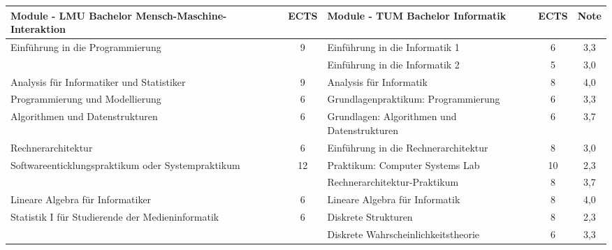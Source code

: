 \documentclass[11pt, a4paper]{awesome-cv}
\begin{document}
\begin{table*}
  \scriptsize
  \centering
  \begin{tabularx}{\textwidth}{|X|c|X|c|c|}

    \hline
    Module - LMU Bachelor Mensch-Maschine-Interaktion      & ECTS & Module - TUM Bachelor Informatik               & ECTS & Note \\
    \hline
    Einführung in die Programmierung                       & 9    & Einführung in die Informatik 1                 & 6    & 3,3  \\
                                                           &      & Einführung in die Informatik 2                 & 5    & 3,0  \\

    \rowcolor{awesome!25}
    Analysis für Informatiker und Statistiker              & 9    & Analysis für Informatik                        & 8    & 4,0  \\

    Programmierung und Modellierung                        & 6    & Grundlagenpraktikum: Programmierung            & 6    & 3,3  \\

    \rowcolor{awesome!25}
    Algorithmen und Datenstrukturen                        & 6    & Grundlagen: Algorithmen und Datenstrukturen    & 6    & 3,7  \\

    Rechnerarchitektur                                     & 6    & Einführung in die Rechnerarchitektur           & 8    & 3,0  \\

    \rowcolor{awesome!25}
    Softwareenticklungspraktikum oder Systempraktikum      & 12   & Praktikum: Computer Systems Lab                & 10   & 2,3  \\
    \rowcolor{awesome!25}
                                                           &      & Rechnerarchitektur-Praktikum                   & 8    & 3,7  \\

    Lineare Algebra für Informatiker                       & 6    & Lineare Algebra für Informatik                 & 8    & 4,0  \\

    \rowcolor{awesome!25}
    Statistik I für Studierende der Medieninformatik       & 6    & Diskrete Strukturen                            & 8    & 2,3  \\
    \rowcolor{awesome!25}
                                                           &      & Diskrete Wahrscheinlichkeitstheorie            & 6    & 3,3  \\


\end{tabularx}
\end{table*}
\end{document}
